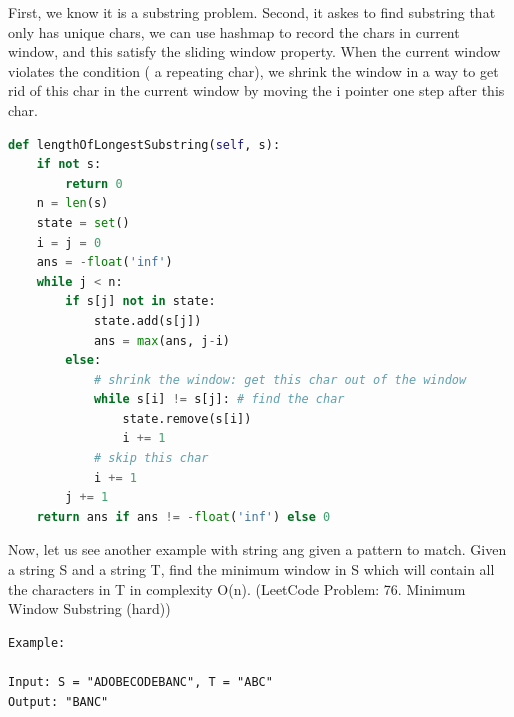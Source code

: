 \documentclass[../searching.tex]{subfiles}
\begin{document}
First, we know it is a substring problem. Second, it askes to find substring that only has unique chars, we can use hashmap to record the chars in current window, and this satisfy the sliding window property. When the current window violates the condition ( a repeating char), we shrink the window in a way to get rid of this char in the current window by moving the i pointer one step after this char. 
\begin{lstlisting}[language=Python]
def lengthOfLongestSubstring(self, s):
    if not s:
        return 0
    n = len(s)
    state = set()
    i = j = 0
    ans = -float('inf')
    while j < n:
        if s[j] not in state:
            state.add(s[j])
            ans = max(ans, j-i)
        else:
            # shrink the window: get this char out of the window
            while s[i] != s[j]: # find the char
                state.remove(s[i])
                i += 1
            # skip this char
            i += 1
        j += 1
    return ans if ans != -float('inf') else 0
\end{lstlisting}

Now, let us see another example with string ang given a pattern to match. Given a string S and a string T, find the minimum window in S which will contain all the characters in T in complexity O(n). (LeetCode Problem: 76. Minimum Window Substring (hard))
\begin{lstlisting}[numbers=none]
Example:

Input: S = "ADOBECODEBANC", T = "ABC"
Output: "BANC"
\end{lstlisting}
\end{document}
